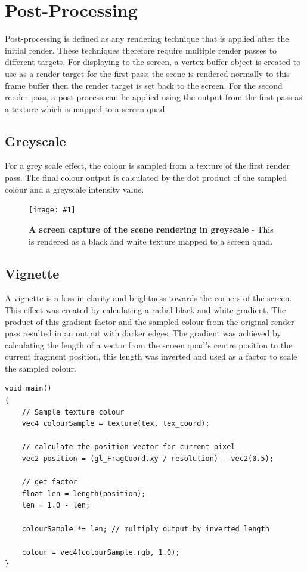 \documentclass[conference]{acmsiggraph}
\newcommand{\figuremacroW}[4]{
\begin{figure}[h] %
	\centering
	\texttt{[image: \#1]}
	\caption[#2]{\textbf{#2} - #3}
	\label{fig:#1}
\end{figure}
}
\begin{document}
\section{Post-Processing}
	
Post-processing is defined as any rendering technique that is applied after the initial render. These techniques therefore require multiple render passes to different targets. For displaying to the screen, a vertex buffer object is created to use as a render target for the first pass; the scene is rendered normally to this frame buffer then the render target is set back to the screen. For the second render pass, a post process can be applied using the output from the first pass as a texture which is mapped to a screen quad.
	
\subsection{Greyscale}
	
For a grey scale effect, the colour is sampled from a texture of the first render pass. The final colour output is calculated by the dot product of the sampled colour and a greyscale intensity value.
	
\figuremacroW
{greyscale}
{A screen capture of the scene rendering in greyscale}
{This is rendered as a black and white texture mapped to a screen quad.}
{1.0}
	
\subsection{Vignette}
	
A vignette is a loss in clarity and brightness towards the corners of the screen. This effect was created by calculating a radial black and white gradient. The product of this gradient factor and the sampled colour from the original render pass resulted in an output with darker edges. The gradient was achieved by calculating the length of a vector from the screen quad's centre position to the current fragment position, this length was inverted and used as a factor to scale the sampled colour. 
	
\begin{lstlisting}[label = {lst:vignette}, caption={Fragment Shader Code Snippet for Vignette Calculation}]
void main()
{
	// Sample texture colour
	vec4 colourSample = texture(tex, tex_coord);
	
	// calculate the position vector for current pixel
	vec2 position = (gl_FragCoord.xy / resolution) - vec2(0.5);
	
	// get factor
	float len = length(position);
	len = 1.0 - len;
	
	colourSample *= len; // multiply output by inverted length
	
	colour = vec4(colourSample.rgb, 1.0);
}
\end{lstlisting}
	
\end{document}

